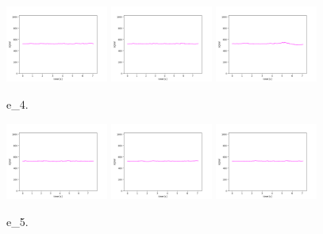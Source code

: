 \begin{figure}[!ht]
\begin{center}
\includegraphics[width=0.3\textwidth]{../data/e_4/e_4_1.png}
\includegraphics[width=0.3\textwidth]{../data/e_4/e_4_2.png}
\includegraphics[width=0.3\textwidth]{../data/e_4/e_4_3.png}
\caption{e\_4.\label{fig:e_4}}
\end{center}
\end{figure}

\begin{figure}[!ht]
\begin{center}
\includegraphics[width=0.3\textwidth]{../data/e_5/e_5_1.png}
\includegraphics[width=0.3\textwidth]{../data/e_5/e_5_2.png}
\includegraphics[width=0.3\textwidth]{../data/e_5/e_5_3.png}
\caption{e\_5.\label{fig:e_5}}
\end{center}
\end{figure}

